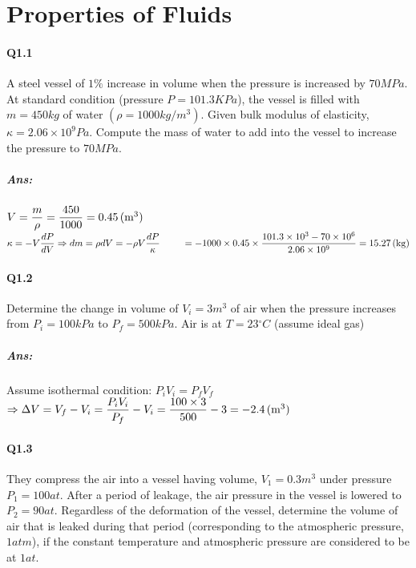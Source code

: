 \chapter{Properties of Fluids}
\subsubsection{Q1.1}
A steel vessel of $ 1\% $ increase in volume when the pressure is increased by $ 70 \unit{MPa} $. At standard
condition (pressure $ P = 101.3 \unit{KPa} $), the vessel is filled with $m= 450 \unit{kg} $ of water $ (\rho=1000\unit{kg/m^3}) $. Given bulk modulus of elasticity, $ \kappa= 2.06\times10^9 \unit{Pa} $. Compute the mass of water to add into the vessel to increase the pressure to $ 70\unit{MPa} $.
\paragraph{Ans:}$ $\\
$ V = \dfrac{m}{\rho} = \dfrac{450}{1000} = 0.45\, (\mathrm{m^3})$\\
$ \kappa=-V\dfrac{dP}{dV} \Rightarrow dm = \rho dV = -\rho V\dfrac{dP}{\kappa} \\ \text{ \qquad}=-1000\times0.45\times\dfrac{101.3\times10^3-70\times10^6}{2.06\times10^9}=15.27\, (\mathrm{kg})$
\subsubsection{Q1.2}
Determine the change in volume of $ V_i=3\unit{m^3} $ of air when the pressure increases from $ P_i=100\unit{kPa} $ to $P_f= 500\unit{kPa} $. Air is at $ T=23\unit{^\circ C} $ (assume ideal gas)
\paragraph{Ans:}$ $\\
Assume isothermal condition: $ P_iV_i=P_fV_f $\\
$ \Rightarrow \Delta V = V_f - V_i = \dfrac{P_iV_i}{P_f} - V_i =\dfrac{100\times3}{500} - 3 = -2.4\, (\mathrm{m^3})$
\subsubsection{Q1.3}
They compress the air into a vessel having volume, $ V_1 = 0.3 \unit{m^3} $ under pressure $ P_1 = 100 \unit{at} $. After a period of leakage, the air pressure in the vessel is lowered to $ P_2 = 90 \unit{at} $. Regardless of the deformation of the vessel, determine the volume of air that is leaked during that period (corresponding to the atmospheric pressure, $1 \unit{atm} $), if the constant temperature and atmospheric pressure are considered to be at $ 1\unit{at} $.
